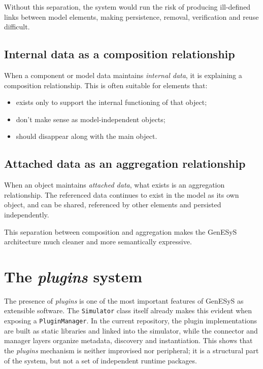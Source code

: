 Without this separation, the system would run the risk of producing ill-defined links between model elements, making persistence, removal, verification and reuse difficult.

\subsection{Internal data as a composition relationship}
\label{subsec:cap8_internaldata_composicao}

When a component or model data maintains \textit{internal data}, it is explaining a composition relationship. This is often suitable for elements that:
\begin{itemize}
 \item exists only to support the internal functioning of that object;
 \item don't make sense as model-independent objects;
 \item should disappear along with the main object.
\end{itemize}

\subsection{Attached data as an aggregation relationship}
\label{subsec:cap8_attacheddata_agregacao}

When an object maintains \textit{attached data}, what exists is an aggregation relationship. The referenced data continues to exist in the model as its own object, and can be shared, referenced by other elements and persisted independently.

This separation between composition and aggregation makes the GenESyS architecture much cleaner and more semantically expressive.

\section{The \textit{plugins} system}
\label{sec:cap8_sistema_plugins}

The presence of \textit{plugins} is one of the most important features of GenESyS as extensible software. The \texttt{Simulator} class itself already makes this evident when exposing a \texttt{PluginManager}. In the current repository, the plugin implementations are built as static libraries and linked into the simulator, while the connector and manager layers organize metadata, discovery and instantiation. This shows that the \textit{plugins} mechanism is neither improvised nor peripheral; it is a structural part of the system, but not a set of independent runtime packages.

